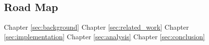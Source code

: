 \subsection{Road Map}

Chapter \ref{sec:background}
Chapter \ref{sec:related_work}
Chapter \ref{sec:implementation}
Chapter \ref{sec:analysis}
Chapter \ref{sec:conclusion}
